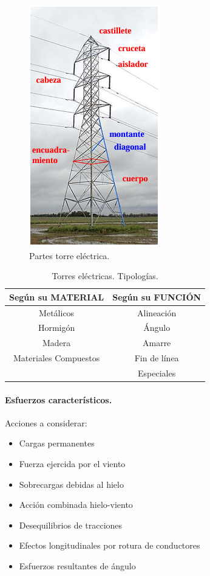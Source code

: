 \begin{figure}[h]
    \centering
    \includegraphics[width=0.5\linewidth]{Imagenes/Torres electricas.png}
    \caption{Partes torre eléctrica.}
\end{figure}


\begin{table}[H]
    \centering
    \begin{tabular}{c|c}
         Según su MATERIAL & Según su FUNCIÓN \\
         \hline
         Metálicos & Alineación\\
         Hormigón & Ángulo\\
         Madera & Amarre \\
         Materiales Compuestos & Fin de línea \\
         & Especiales
    \end{tabular}
    \caption{Torres eléctricas. Tipologías.}
\end{table}

\paragraph{Esfuerzos característicos.}
Acciones a considerar:
\begin{itemize}
    \item Cargas permanentes
    \item Fuerza ejercida por el viento
    \item Sobrecargas debidas al hielo
    \item Acción combinada hielo-viento
    \item Desequilibrios de tracciones
    \item Efectos longitudinales por rotura de conductores
    \item Esfuerzos resultantes de ángulo
\end{itemize}

